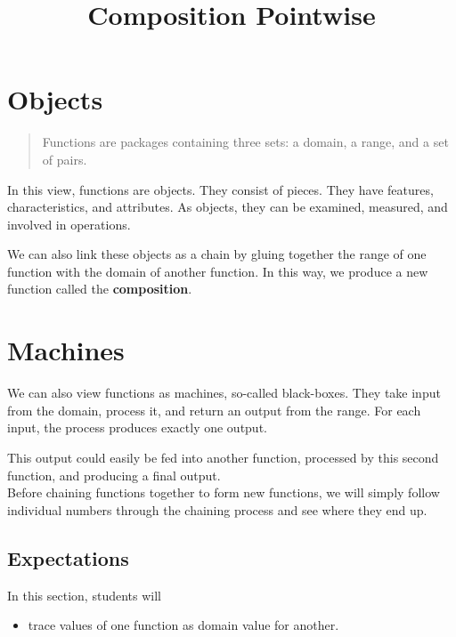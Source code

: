 \documentclass{ximera}
\title{Composition Pointwise}
\begin{document}
\begin{abstract}
\end{abstract}
\maketitle



\section{Objects}


\begin{quote}
Functions are packages containing three sets: a domain, a range, and a set of pairs.
\end{quote}

In this view, functions are objects.  They consist of pieces. They have features, characteristics, and attributes.  As objects, they can be examined, measured, and involved in operations.


We can also link these objects as a chain by gluing together the range of one function with the domain of another function.  In this way, we produce a new function called the \textbf{composition}.












\section{Machines}



We can also view functions as machines, so-called black-boxes.  They take input from the domain, process it, and return an output from the range.  For each input, the process produces exactly one output.



This output could easily be fed into another function, processed by this second function, and producing a final output. \\



Before chaining functions together to form new functions, we will simply follow individual numbers through the chaining process and see where they end up.















\subsection{Expectations}


\begin{sectionOutcomes}
In this section, students will 

\begin{itemize}
\item trace values of one function as domain value for another.

\end{itemize}
\end{sectionOutcomes}
\end{document}
